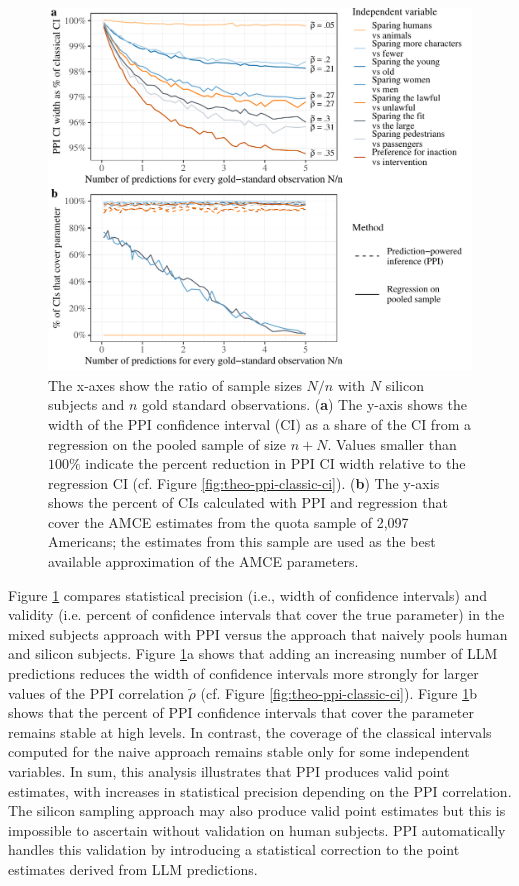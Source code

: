\documentclass{article}
\begin{document}
\begin{figure}[p]
    \includegraphics[width=1\linewidth]{8_SimulationResults_gpt4turbo_wp_Saved_Nn_n500.pdf}
    \caption{The x-axes show the ratio of sample sizes $N/n$ with $N$ silicon subjects and $n$ gold standard observations. (\textbf{a}) The y-axis shows the width of the PPI confidence interval (CI) as a share of the CI from a regression on the pooled sample of size $n+N$. Values smaller than $100\%$ indicate the percent reduction in PPI CI width relative to the regression CI (cf. Figure \ref{fig:theo-ppi-classic-ci}). (\textbf{b}) The y-axis shows the percent of CIs calculated with PPI and regression that cover the AMCE estimates from the quota sample of 2,097 Americans; the estimates from this sample are used as the best available approximation of the AMCE parameters.}
    \label{fig:coverage-width}
\end{figure}

\clearpage

Figure \ref{fig:coverage-width} compares statistical precision (i.e., width of confidence intervals) and validity (i.e. percent of confidence intervals that cover the true parameter) in the mixed subjects approach with PPI versus the approach that naively pools human and silicon subjects.
Figure \ref{fig:coverage-width}a shows that adding an increasing number of LLM predictions reduces the width of confidence intervals more strongly for larger values of the PPI correlation $\tilde{\rho}$ (cf. Figure \ref{fig:theo-ppi-classic-ci}).
Figure \ref{fig:coverage-width}b shows that the percent of PPI confidence intervals that cover the parameter remains stable at high levels. In contrast, the coverage of the classical intervals computed for the naive approach remains stable only for some independent variables.
In sum, this analysis illustrates that PPI produces valid point estimates, with increases in statistical precision depending on the 
PPI correlation. The silicon sampling approach may also produce valid point estimates but this is impossible to ascertain without validation on human subjects. PPI automatically handles this validation by introducing a statistical correction to the point estimates derived from LLM predictions.
\end{document}
